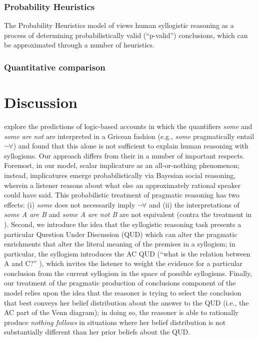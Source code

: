\documentclass[floatsintext, doc]{apa6}
\begin{document}
\subsubsection{Probability Heuristics} 

The Probability Heuristics model of  views human syllogistic reasoning as a process of determining probabilistically valid (``p-valid'') conclusions, which can be approximated through a number of heuristics. 


\subsubsection{Quantitative comparison}




\section{Discussion}

 explore the predictions of logic-based accounts in which the quantifiers \emph{some} and \emph{some are not} are interpreted in a Gricean fashion (e.g., \emph{some} pragmatically entail $\neg \forall$) and found that this alone is not sufficient to explain human reasoning with syllogisms. 
Our approach differs from their in a number of important respects.
Foremost, in our model, scalar implicature as an all-or-nothing phenomenon; instead, implicatures emerge probabilistically via Bayesian social reasoning, wherein a listener reasons about what else an approximately rational speaker could have said. 
This probabilistic treatment of pragmatic reasoning has two effects: (i) \emph{some} does not necessarily imply $\neg \forall$ and (ii) the interpretations of \emph{some A are B} and \emph{some A are not B} are not equivalent (contra the treatment in ).
Second, we introduce the idea that the syllogistic reasoning task presents a particular Question Under Discussion (QUD) which can alter the pragmatic enrichments that alter the literal meaning of the premises in a syllogism; in particular, the syllogism introduces the \textsc{AC} QUD (``what is the relation between A and C?'' ), which invites the listener to weight the evidence for a particular conclusion from the current syllogism in the space of possible syllogisms. 
Finally, our treatment of the pragmatic production of conclusions component of the model relies upon the idea that the reasoner is trying to select the conclusion that best conveys her belief distribution about the answer to the QUD (i.e., the AC part of the Venn diagram); in doing so, the reasoner is able to rationally produce \emph{nothing follows} in situations where her belief distribution is not substantially different than her prior beliefs about the QUD. 



\newpage



\end{document}
